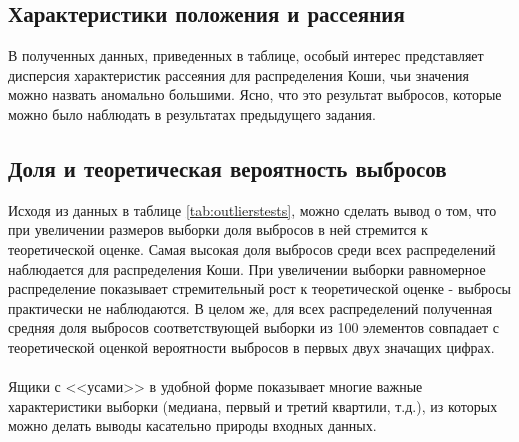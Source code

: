 \documentclass[a4paper]{article}
\begin{document}
\subsection{Характеристики положения и рассеяния}
В полученных данных, приведенных в таблице, особый интерес представляет дисперсия характеристик рассеяния для распределения Коши, чьи значения можно назвать аномально большими. Ясно, что это результат выбросов, которые можно было наблюдать в результатах предыдущего задания.
\subsection{Доля и теоретическая вероятность выбросов}
Исходя из данных в таблице \ref{tab:outlierstests}, можно сделать вывод о том, что при увеличении размеров выборки доля выбросов в ней стремится к теоретической оценке. Самая высокая доля выбросов среди всех распределений наблюдается для распределения Коши. При увеличении выборки равномерное распределение показывает стремительный рост к теоретической оценке - выбросы практически не наблюдаются. В целом же, для всех распределений полученная средняя доля выбросов соответствующей выборки из 100 элементов совпадает с теоретической оценкой вероятности выбросов в первых двух значащих цифрах.\\\\
Ящики с <<усами>> в удобной форме показывает многие важные характеристики выборки (медиана, первый и третий квартили, т.д.), из которых можно делать выводы касательно природы входных данных.
\end{document}
